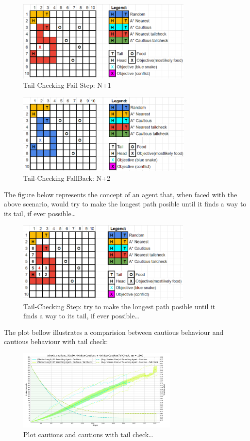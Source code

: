 \begin{figure}
\includegraphics[height=1.6in]{E2}
\caption{Tail-Checking Fail Step: N+1}
\end{figure}

\begin{figure}
\includegraphics[height=1.6in]{E3}
\caption{Tail-Checking FallBack: N+2}
\end{figure}


The figure below represents the concept of an agent that, when faced with the above scenario, would try to make the longest path posible until it finds a way to its tail, if ever possible\dots

\begin{figure}
\includegraphics[height=1.6in]{F1}
\caption{Tail-Checking Step: try to make the longest path posible until it finds a way to its tail, if ever possible\dots}
\end{figure}


The plot bellow illustrates a comparision between cautious behaviour and cautious behaviour with tail check:
\begin{figure}
\includegraphics[height=1.6in]{plot_tcheck_cautious}
\caption{Plot cautions and cautions with tail check\dots}
\end{figure}

